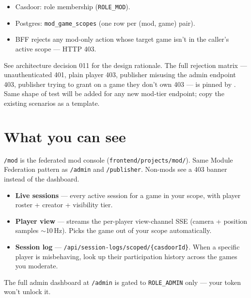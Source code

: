 \documentclass[11pt,a4paper,openany]{book}
\begin{document}
\begin{itemize}
  \item Casdoor: role membership (\texttt{ROLE\_MOD}).
  \item Postgres: \texttt{mod\_game\_scopes} (one row per (mod, game)
        pair).
  \item BFF rejects any mod-only action whose target game isn't in the
        caller's active scope --- HTTP 403.
\end{itemize}

See architecture decision 011 for the design rationale. The full
rejection matrix --- unauthenticated 401, plain player 403, publisher
misusing the admin endpoint 403, publisher trying to grant on a game
they don't own 403 --- is pinned by
. Same shape
of test will be added for any new mod-tier endpoint; copy the existing
scenarios as a template.

\chapter{What you can see}
\texttt{/mod} is the federated mod console
(\texttt{frontend/projects/mod/}). Same Module Federation pattern as
\texttt{/admin} and \texttt{/publisher}. Non-mods see a 403 banner
instead of the dashboard.

\begin{itemize}
  \item \textbf{Live sessions} --- every active session for a game in
        your scope, with player roster + creator + visibility tier.
  \item \textbf{Player view} --- streams the per-player view-channel
        SSE (camera + position samples \(\sim\)10\,Hz). Picks the game
        out of your scope automatically.
  \item \textbf{Session log} --- \texttt{/api/session-logs/scoped/\{casdoorId\}}.
        When a specific player is misbehaving, look up their
        participation history across the games you moderate.
\end{itemize}

The full admin dashboard at \texttt{/admin} is gated to
\texttt{ROLE\_ADMIN} only --- your token won't unlock it.
\end{document}
